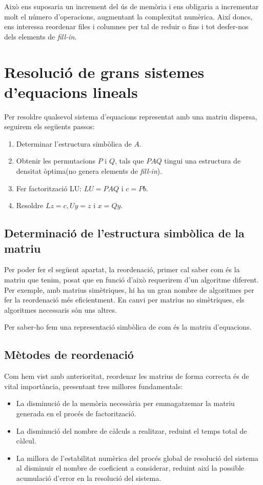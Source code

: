 \documentclass[11pt,a4paper,twoside]{report}
\begin{document}
Això ens suposaria un increment del ús de memòria i ens obligaria a incrementar molt el número d'operacions, augmentant la complexitat numèrica. Així doncs, ens interessa reordenar files i columnes per tal de reduir o fins i tot desfer-nos dels elements de \textit{fill-in}. 

\section{Resolució de grans sistemes d'equacions lineals}

Per resoldre qualsevol sistema d'equacions representat amb una matriu dispersa, seguirem els següents passos:

\begin{enumerate}
	\item Determinar l'estructura simbòlica de $A$.
	\item Obtenir les permutacions $P$ i $Q$, tals que $PAQ$ tingui una estructura de densitat òptima(no genera elements de \textit{fill-in}).
	\item Fer factorització LU: $LU = PAQ$ i $c = Pb$.
	\item Resoldre $Lz = c, Uy = z$ i $x=Qy$.
\end{enumerate}

\subsection{Determinació de l'estructura simbòlica de la matriu}

Per poder fer el següent apartat, la reordenació, primer cal saber com és la matriu que tenim, posat que en funció d'això requerirem d'un algoritme diferent. Per exemple, amb matrius simètriques, hi ha un gran nombre de algoritmes per fer la reordenació més eficientment. En canvi per matrius no simètriques, els algoritmes necessaris són uns altres.

Per saber-ho fem una representació simbòlica de com és la matriu d'equacions.

\subsection{Mètodes de reordenació}

Com hem vist amb anterioritat, reordenar les matrius de forma correcta és de vital importància, presentant tres millores fundamentals:

\begin{itemize}
	\item La disminució de la memòria necessària per emmagatzemar la matriu generada en el procés de factorització.
	\item La disminució del nombre de càlculs a realitzar, reduint el temps total de càlcul.
	\item La millora de l'estabilitat numèrica del procés global de resolució del sistema al disminuir el nombre de coeficient a considerar, reduint així la possible acumulació d'error en la resolució del sistema.
\end{itemize}
\end{document}
